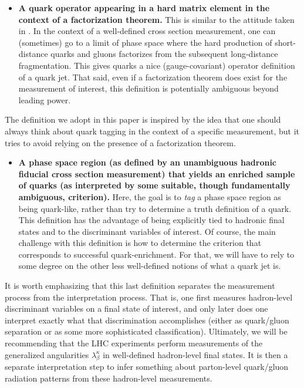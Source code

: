\documentclass[11pt]{cernrep}
\begin{document}
\begin{itemize}
\item \textbf{A quark operator appearing in a hard matrix element in the context of a factorization theorem.}  This is similar to the attitude taken in \cite{}.  In the context of a well-defined cross section measurement, one can (sometimes) go to a limit of phase space where the hard production of short-distance quarks and gluons factorizes from the subsequent long-distance fragmentation.  This gives quarks a nice (gauge-covariant) operator definition of a quark jet.  That said, even if a factorization theorem does exist for the measurement of interest, this definition is potentially ambiguous beyond leading power.
\end{itemize}
The definition we adopt in this paper is inspired by the idea that one should always think about quark tagging in the context of a specific measurement, but it tries to avoid relying on the presence of a factorization theorem.
\begin{itemize}
\item \textbf{A phase space region (as defined by an unambiguous hadronic fiducial cross section measurement) that yields an enriched sample of quarks (as interpreted by some suitable, though fundamentally ambiguous, criterion).}  Here, the goal is to \emph{tag} a phase space region as being quark-like, rather than try to determine a truth definition of a quark.  This definition has the advantage of being explicitly tied to hadronic final states and to the discriminant variables of interest.   Of course, the main challenge with this definition is how to determine the criterion that corresponds to successful quark-enrichment.  For that, we will have to rely to some degree on the other less well-defined notions of what a quark jet is.
\end{itemize}  

It is worth emphasizing that this last definition separates the measurement process from the interpretation process.  That is, one first measures hadron-level discriminant variables on a final state of interest, and only later does one interpret exactly what that discrimination accomplishes (either as quark/gluon separation or as some more sophisticated classification).  Ultimately, we will be recommending that the LHC experiments perform measurements of the generalized angularities $\lambda_\beta^\kappa$ in well-defined hadron-level final states.  It is then a separate interpretation step to infer something about parton-level quark/gluon radiation patterns from these hadron-level measurements.
\end{document}
